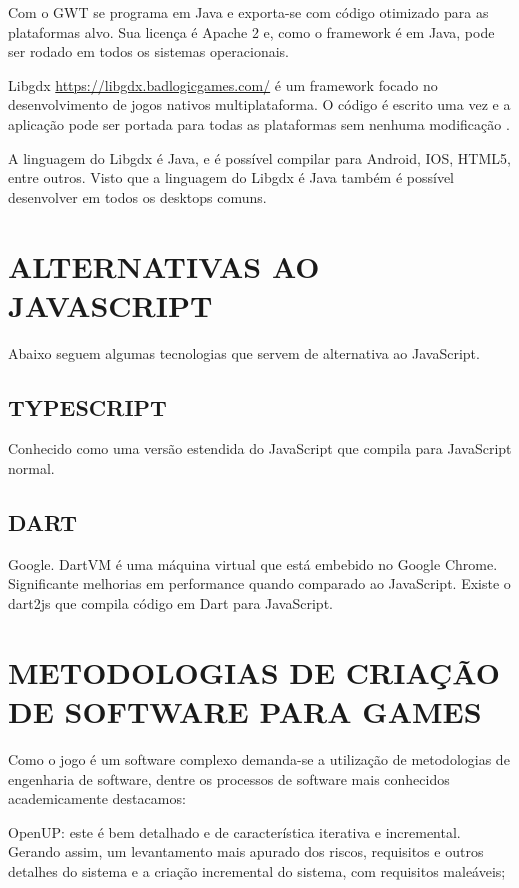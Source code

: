 Com o GWT se programa em Java e exporta-se com código otimizado para
as plataformas alvo. Sua licença é Apache 2 e, como o framework é em Java,
pode ser rodado em todos os sistemas operacionais.

Libgdx \url{https://libgdx.badlogicgames.com/} é um framework
focado no desenvolvimento de jogos nativos multiplataforma. O
código é escrito uma vez e a aplicação pode ser portada para
todas as plataformas sem nenhuma modificação \autocite[pp.
8]{crossPlatformMobileGameDevelopment}.

A linguagem do Libgdx é Java, e é possível compilar para Android,
IOS, HTML5, entre outros. Visto que a linguagem do Libgdx é Java
também é possível desenvolver em todos os desktops comuns.

\chapter{ALTERNATIVAS AO JAVASCRIPT}

Abaixo seguem algumas tecnologias que servem de alternativa ao
JavaScript.

\section{TYPESCRIPT}

Conhecido como uma versão estendida do JavaScript que compila para
JavaScript normal.

\section{DART}

Google. DartVM é uma máquina virtual que está embebido no Google
Chrome. Significante melhorias em performance quando comparado
ao JavaScript. Existe o dart2js que compila código em Dart para
JavaScript.

\chapter{METODOLOGIAS DE CRIAÇÃO DE SOFTWARE PARA GAMES}

Como o jogo é um software complexo demanda-se a utilização de
metodologias de engenharia de software, dentre os processos de software
mais conhecidos academicamente destacamos:

OpenUP: este é bem detalhado e de característica iterativa e
incremental. Gerando assim, um levantamento mais apurado dos riscos,
requisitos e outros detalhes do sistema e a criação incremental do
sistema, com requisitos maleáveis;

